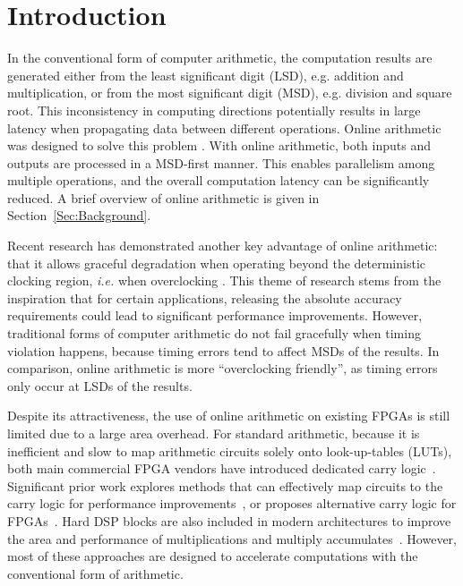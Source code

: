 \documentclass[conference]{IEEEtran}
\begin{document}
%



\section{Introduction}\label{Sec:Intro}
In the conventional form of computer arithmetic, the computation results are generated either from the least significant digit (LSD), e.g. addition and multiplication, or from the most significant digit (MSD), e.g. division and square root. This inconsistency in computing directions potentially results in large latency when propagating data between different operations. Online arithmetic was designed to solve this problem \cite{Ercegovac_OnlineOverview,Ercegovac_Book}. With online arithmetic, both inputs and outputs are processed in a MSD-first manner. This enables parallelism among multiple operations, and the overall computation latency can be significantly reduced. A brief overview of online arithmetic is given in Section~\ref{Sec:Background}.

Recent research has demonstrated another key advantage of online arithmetic: that it allows graceful degradation when operating beyond the deterministic clocking region,  \textit{i.e.} when overclocking \cite{SKDAC14_REVIEW}. This theme of research stems from the inspiration that for certain applications, releasing the absolute accuracy requirements could lead to significant performance improvements. However, traditional forms of computer arithmetic do not fail gracefully when timing violation happens, because timing errors tend to affect MSDs of the results. In comparison, online arithmetic is more ``overclocking friendly'', as timing errors only occur at LSDs of the results.

Despite its attractiveness, the use of online arithmetic on existing FPGAs is still limited due to a large area overhead. For standard arithmetic, because it is inefficient and slow to map arithmetic circuits solely onto look-up-tables (LUTs), both main commercial FPGA vendors have introduced dedicated carry logic~\cite{Virtex6}. Significant prior work explores methods that can effectively map circuits to the carry logic for performance improvements~\cite{FPL10_FPGA_CarryChain}, or proposes alternative carry logic for FPGAs~\cite{FPGA_CarryChain_New1,FPGA_CarryChain_New2}. Hard DSP blocks are also included in modern architectures to improve the area and performance of multiplications and multiply accumulates~\cite{XilinxDSP}. However, most of these approaches are designed to accelerate computations with the conventional form of arithmetic.
\end{document}
